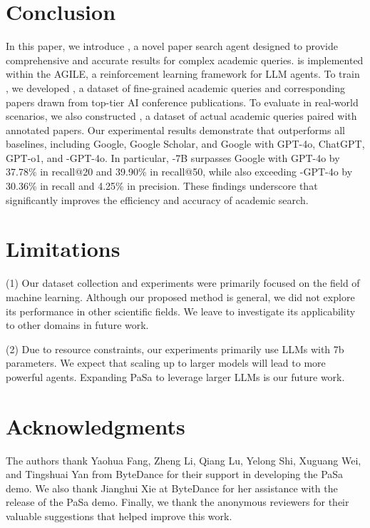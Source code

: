 \section{Conclusion}

In this paper, we introduce \pasa, a novel paper search agent designed to provide comprehensive and accurate results for complex academic queries. \pasa is implemented within the AGILE, a reinforcement learning framework for LLM agents. To train \pasa, we developed \autoS, a dataset of fine-grained academic queries and corresponding papers drawn from top-tier AI conference publications. To evaluate \pasa in real-world scenarios, we also constructed \realS, a dataset of actual academic queries paired with annotated papers. Our experimental results demonstrate that \pasa outperforms all baselines, including Google, Google Scholar, and Google with GPT-4o, ChatGPT, GPT-o1, and \pasa-GPT-4o. In particular, \pasa-7B surpasses Google with GPT-4o by 37.78\% in recall@20 and 39.90\% in recall@50, while also exceeding \pasa-GPT-4o by 30.36\% in recall and 4.25\% in precision. These findings underscore that \pasa significantly improves the efficiency and accuracy of academic search. 

\section*{Limitations}

(1) Our dataset collection and experiments were primarily focused on the field of machine learning. Although our proposed method is general, we did not explore its performance in other scientific fields. We leave to investigate its applicability to other domains in future work.

\noindent (2) Due to resource constraints, our experiments primarily use LLMs with 7b parameters. We expect that scaling up to larger models will lead to more powerful agents. Expanding PaSa to leverage larger LLMs is our future work.

\section*{Acknowledgments}
The authors thank Yaohua Fang, Zheng Li, Qiang Lu, Yelong Shi, Xuguang Wei, and Tingshuai Yan from ByteDance for their support in developing the PaSa demo. We also thank Jianghui Xie at ByteDance for her assistance with the release of the PaSa demo. Finally, we thank the anonymous reviewers for their valuable suggestions that helped improve this work.

